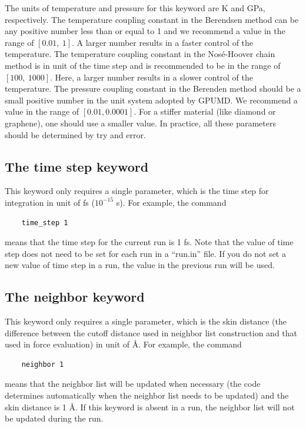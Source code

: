 \documentclass[12pt,a4paper]{report}
\begin{document}
The units of temperature and pressure for this keyword are K and GPa, respectively. The temperature coupling constant in the Berendsen method can be any positive number less than or equal to 1 and we recommend a value in the range of $[0.01,~1]$. A larger number results in a faster control of the temperature. The temperature coupling constant in the Nos\'{e}-Hoover chain method is in unit of the time step and is recommended to be in the range of $[100,~1000]$. Here, a larger number results in a slower control of the temperature. The pressure coupling constant in the Berenden method should be a small positive number in the unit system adopted by GPUMD. We recommend a value in the range of $[0.01,0.0001]$. For a stiffer material (like diamond or graphene), one should use a smaller value. In practice, all these parameters should be determined by try and error.


\subsection{The time step keyword}

This keyword only requires a single parameter, which is the time step for integration in unit of fs ($10^{-15}$ s). For example, the command
\begin{verbatim}
    time_step 1
\end{verbatim}
means that the time step for the current run is 1 fs. Note that the value of time step does not need to be set for each run in a ``run.in'' file. If you do not set a new value of time step in a run, the value in the previous run will be used.



\subsection{The neighbor keyword}

This keyword only requires a single parameter, which is the skin distance (the difference between the cutoff distance used in neighbor list construction and that used in force evaluation) in unit of \AA. For example, the command
\begin{verbatim}
    neighbor 1
\end{verbatim}
means that the neighbor list will be updated when necessary (the code determines automatically when the neighbor list needs to be updated) and the skin distance is 1 \AA. If this keyword is absent in a run, the neighbor list will not be updated during the run.
\end{document}
